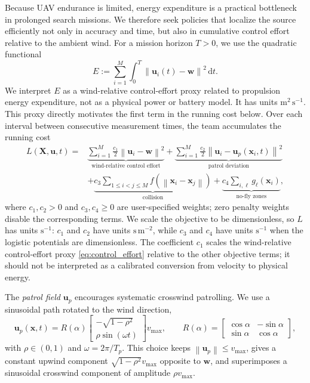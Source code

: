 \documentclass{article}
\newcommand{\norm}[1]{\left\|#1\right\|}
\newcommand{\dd}{\mathrm{d}}
\newcommand{\bs}[1]{\boldsymbol{#1}}
\newcommand{\x}{\mathbf{x}}
\renewcommand{\u}{\mathbf{u}}
\newcommand{\bX}{\mathbf{X}}
\begin{document}
Because UAV endurance is limited, energy expenditure is a practical bottleneck in prolonged search missions.
We therefore seek policies that localize the source efficiently not only in accuracy and time, but also in cumulative control effort relative to the ambient wind.
For a mission horizon $T>0$, we use the quadratic functional
\begin{equation}
\label{eq:control_effort}
E :=
\sum_{i=1}^M \int_0^T \norm{\u_i(t)-\bs w}^2\,\dd t.
\end{equation}
We interpret $E$ as a wind-relative control-effort proxy related to propulsion energy expenditure, not as a physical power or battery model.
It has units $\mathrm{m^2\,s^{-1}}$.
This proxy directly motivates the first term in the running cost below.
Over each interval between consecutive measurement times, the team accumulates the running cost
\begin{equation}
\label{eq:running_cost}
\begin{aligned}
L(\bX,\u,t)=
{}&\underbrace{\sum_{i=1}^M \frac{c_1}{2}\norm{\u_i-\bs w}^2}_{\text{wind-relative control effort}}
+\underbrace{\sum_{i=1}^M \frac{c_2}{2}\norm{\u_i-\u_p(\x_i,t)}^2}_{\text{patrol deviation}}
\\
&+\underbrace{c_3\!\!\sum_{1\le i<j\le M}\!\! f\!\left(\norm{\x_i-\x_j}\right)}_{\text{collision}}
+\underbrace{c_4\sum_{i,\ell} g_\ell(\x_i)}_{\text{no-fly zones}},
\end{aligned}
\end{equation}
where $c_1,c_2>0$ and $c_3,c_4\ge0$ are user-specified weights; zero penalty weights disable the corresponding terms.
We scale the objective to be dimensionless, so $L$ has units $\mathrm{s^{-1}}$: $c_1$ and $c_2$ have units $\mathrm{s\,m^{-2}}$, while $c_3$ and $c_4$ have units $\mathrm{s^{-1}}$ when the logistic potentials are dimensionless.
The coefficient $c_1$ scales the wind-relative control-effort proxy \eqref{eq:control_effort} relative to the other objective terms; it should not be interpreted as a calibrated conversion from velocity to physical energy.

The \emph{patrol field} $\u_p$ encourages systematic crosswind patrolling.
We use a sinusoidal path rotated to the wind direction,
\begin{equation}
\label{eq:patrol_field}
\u_p(\x,t)=
R(\alpha)\begin{bmatrix}-\sqrt{1-\rho^2}\\ \rho\sin(\omega t)\end{bmatrix}v_{\max},
\qquad
R(\alpha)=\begin{bmatrix}\cos\alpha&-\sin\alpha\\\sin\alpha&\cos\alpha\end{bmatrix},
\end{equation}
with $\rho\in(0,1)$ and $\omega=2\pi/T_p$.
This choice keeps $\norm{\u_p}\le v_{\max}$, gives a constant upwind component $\sqrt{1-\rho^{2}}v_{\max}$ opposite to $\bs w$, and superimposes a sinusoidal crosswind component of amplitude $\rho v_{\max}$.
\end{document}
